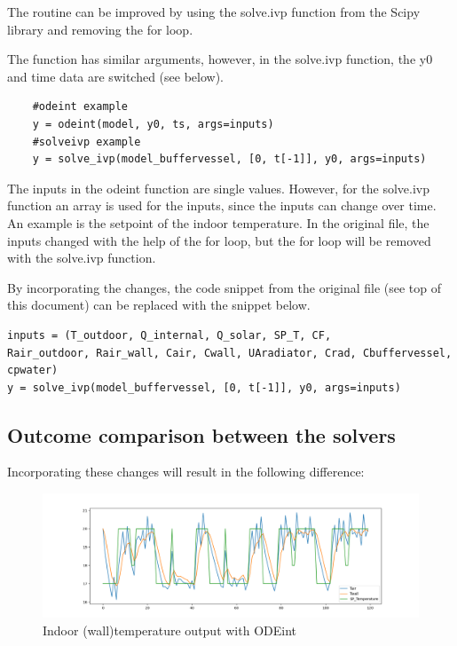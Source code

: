The routine can be improved by using the solve.ivp function from the Scipy library and removing the for loop.

The function has similar arguments, however, in the solve.ivp function, the y0 and time data are switched (see below).


\begin{lstlisting}
	#odeint example
	y = odeint(model, y0, ts, args=inputs)
	#solveivp example
	y = solve_ivp(model_buffervessel, [0, t[-1]], y0, args=inputs)
\end{lstlisting}

The inputs in the odeint function are single values. However, for the solve.ivp function an array is used for the inputs, since the inputs can change over time. An example is the setpoint of the indoor temperature. In the original file, the inputs changed with the help of the for loop, but the for loop will be removed with the solve.ivp function.

By incorporating the changes, the code snippet from the original file (see top of this document) can be replaced with the snippet below.

\begin{lstlisting}
inputs = (T_outdoor, Q_internal, Q_solar, SP_T, CF,
Rair_outdoor, Rair_wall, Cair, Cwall, UAradiator, Crad, Cbuffervessel, cpwater)
y = solve_ivp(model_buffervessel, [0, t[-1]], y0, args=inputs)
\end{lstlisting}

\subsection{Outcome comparison between the solvers}

Incorporating these changes will result in the following difference:

\begin{figure}[ht]
	\centering
	\includegraphics[width=1\columnwidth]{pictures/odeint_with_for_loop.png}
	\caption[Short title]{Indoor (wall)temperature output with ODEint}
	\label{fig:profilelabels}
\end{figure}

